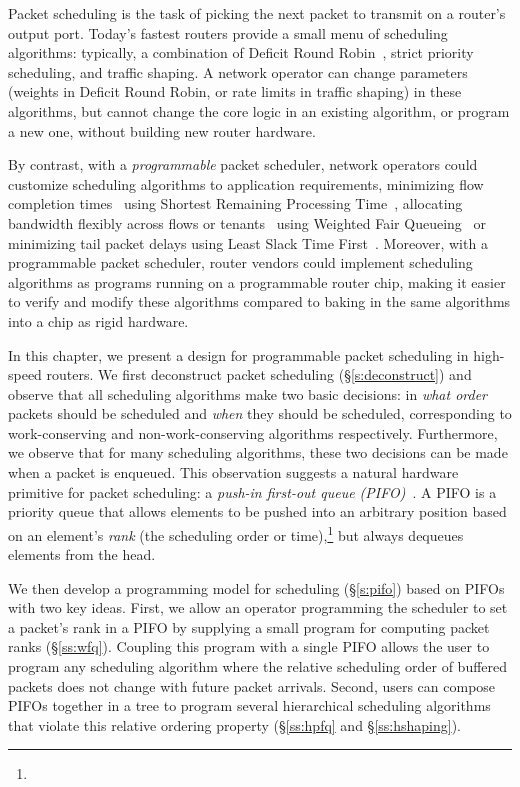 Packet scheduling is the task of picking the next packet to transmit on a
router's output port.  Today's fastest routers provide a small menu of
scheduling algorithms: typically, a combination of Deficit Round
Robin~\cite{drr}, strict priority scheduling, and traffic shaping. A network
operator can change parameters (\eg weights in Deficit Round Robin, or rate
limits in traffic shaping) in these algorithms, but cannot change the core
logic in an existing algorithm, or program a new one, without building new
router hardware.

By contrast, with a {\em programmable} packet scheduler, network operators
could customize scheduling algorithms to application requirements, \eg
minimizing flow completion times~\cite{pFabric} using Shortest Remaining
Processing Time~\cite{srpt}, allocating bandwidth flexibly across flows or
tenants~\cite{eyeq, faircloud} using Weighted Fair Queueing~\cite{wfq} or
minimizing tail packet delays using Least Slack Time First~\cite{lstf}.
Moreover, with a programmable packet scheduler, router vendors could implement
scheduling algorithms as programs running on a programmable router chip, making
it easier to verify and modify these algorithms compared to baking in the same
algorithms into a chip as rigid hardware.

In this chapter, we present a design for programmable packet scheduling in
high-speed routers. We first deconstruct packet scheduling
(\S\ref{s:deconstruct}) and observe that all scheduling algorithms make two
basic decisions: in {\em what order} packets should be scheduled and {\em when}
they should be scheduled, corresponding to work-conserving and
non-work-conserving algorithms respectively.  Furthermore, we observe that for
many scheduling algorithms, these two decisions can be made when a packet is
enqueued. This observation suggests a natural hardware primitive for packet
scheduling: a {\em push-in first-out queue (PIFO)}~\cite{pifo}. A PIFO is a
priority queue that allows elements to be pushed into an arbitrary position
based on an element's {\em rank} (the scheduling order or
time),\footnote{} but always dequeues elements from the head.

We then develop a programming model for scheduling (\S\ref{s:pifo}) based on
PIFOs with two key ideas. First, we allow an operator programming the scheduler
to set a packet's rank in a PIFO by supplying a small program for computing
packet ranks (\S\ref{ss:wfq}).  Coupling this program with a single PIFO allows
the user to program any scheduling algorithm where the relative scheduling
order of buffered packets does not change with future packet arrivals. Second,
users can compose PIFOs together in a tree to program several hierarchical
scheduling algorithms that violate this relative ordering property
(\S\ref{ss:hpfq} and \S\ref{ss:hshaping}).

